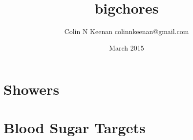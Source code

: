 \documentclass[12pt,letterpaper]{article}
\begin{document}
\title{bigchores{}}
\author{Colin N Keenan colinnkeenan@gmail.com}
\date{March 2015}
\section*{\bigchores}

\section*{Showers}

\section{Blood Sugar Targets}

\end{document}
